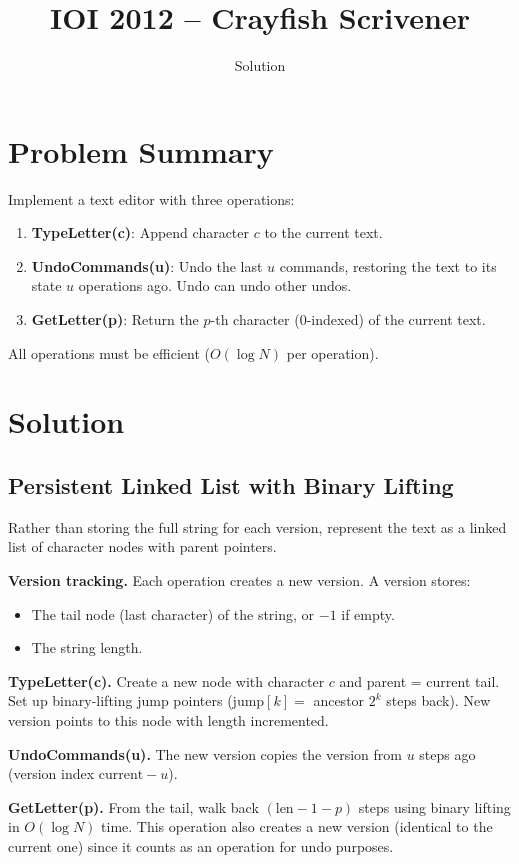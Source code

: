 \documentclass[11pt,a4paper]{article}
\title{IOI 2012 -- Crayfish Scrivener}
\author{Solution}
\date{}
\begin{document}
\maketitle

\section{Problem Summary}
Implement a text editor with three operations:
\begin{enumerate}
    \item \textbf{TypeLetter(c)}: Append character $c$ to the current text.
    \item \textbf{UndoCommands(u)}: Undo the last $u$ commands, restoring the text to its state $u$ operations ago. Undo can undo other undos.
    \item \textbf{GetLetter(p)}: Return the $p$-th character (0-indexed) of the current text.
\end{enumerate}
All operations must be efficient ($O(\log N)$ per operation).

\section{Solution}

\subsection{Persistent Linked List with Binary Lifting}
Rather than storing the full string for each version, represent the text as a linked list of character nodes with parent pointers.

\textbf{Version tracking.} Each operation creates a new version. A version stores:
\begin{itemize}
    \item The tail node (last character) of the string, or $-1$ if empty.
    \item The string length.
\end{itemize}

\textbf{TypeLetter(c).} Create a new node with character $c$ and parent = current tail. Set up binary-lifting jump pointers ($\text{jump}[k] = $ ancestor $2^k$ steps back). New version points to this node with length incremented.

\textbf{UndoCommands(u).} The new version copies the version from $u$ steps ago (version index $\text{current} - u$).

\textbf{GetLetter(p).} From the tail, walk back $(\text{len} - 1 - p)$ steps using binary lifting in $O(\log N)$ time. This operation also creates a new version (identical to the current one) since it counts as an operation for undo purposes.
\end{document}
